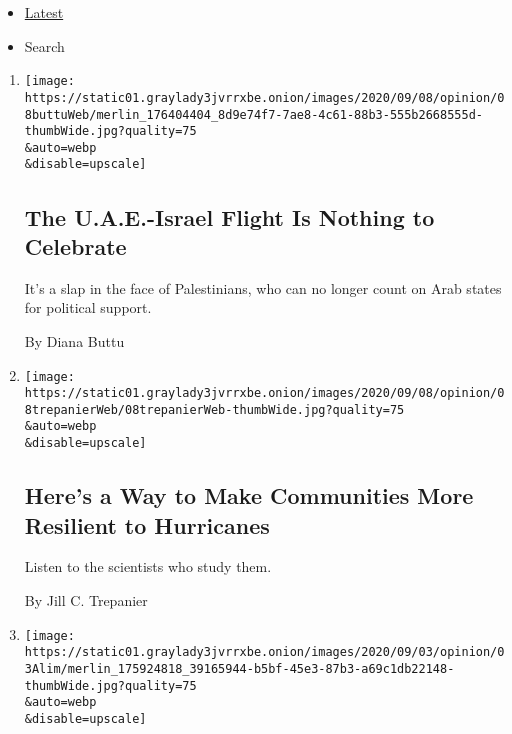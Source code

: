 \begin{itemize}
\tightlist
\item
  \protect\hyperlink{stream-panel}{Latest}
\item
  Search
\end{itemize}

\begin{enumerate}
\def\labelenumi{\arabic{enumi}.}
\item
  \href{/2020/09/08/opinion/uae-israel-palestinians.html}{}

  \texttt{[image: https://static01.graylady3jvrrxbe.onion/images/2020/09/08/opinion/08buttuWeb/merlin\_176404404\_8d9e74f7-7ae8-4c61-88b3-555b2668555d-thumbWide.jpg?quality=75\\\&auto=webp\\\&disable=upscale]}

  \hypertarget{the-uae-israel-flight-is-nothing-to-celebrate}{%
  \subsection{The U.A.E.-Israel Flight Is Nothing to
  Celebrate}\label{the-uae-israel-flight-is-nothing-to-celebrate}}

  It's a slap in the face of Palestinians, who can no longer count on
  Arab states for political support.

  By Diana Buttu
\item
  \href{/2020/09/08/opinion/hurricanes-scientists-damage.html}{}

  \texttt{[image: https://static01.graylady3jvrrxbe.onion/images/2020/09/08/opinion/08trepanierWeb/08trepanierWeb-thumbWide.jpg?quality=75\\\&auto=webp\\\&disable=upscale]}

  \hypertarget{heres-a-way-to-make-communities-more-resilient-to-hurricanes}{%
  \subsection{Here's a Way to Make Communities More Resilient to
  Hurricanes}\label{heres-a-way-to-make-communities-more-resilient-to-hurricanes}}

  Listen to the scientists who study them.

  By Jill C. Trepanier
\item
  \href{/2020/09/08/opinion/kamala-harris-articulate.html}{}

  \texttt{[image: https://static01.graylady3jvrrxbe.onion/images/2020/09/03/opinion/03Alim/merlin\_175924818\_39165944-b5bf-45e3-87b3-a69c1db22148-thumbWide.jpg?quality=75\\\&auto=webp\\\&disable=upscale]}


\end{enumerate}
